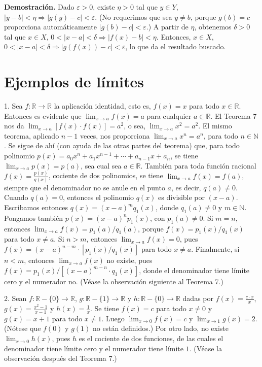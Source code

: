 \documentclass[12pt,oneside]{book}
\begin{document}
\textbf{Demostración.} Dado \(\varepsilon > 0\), existe \(\eta > 0\) tal que \(y \in Y\), \(|y - b| < \eta \Rightarrow |g(y) - c| < \varepsilon\). (No requerimos que sea \(y \neq b\), porque \(g(b) = c\) proporciona automáticamente \(|g(b) - c| < \varepsilon\).) A partir de \(\eta\), obtenemos \(\delta > 0\) tal que \(x \in X\), \(0 < |x - a| < \delta \Rightarrow |f(x) - b| < \eta\). Entonces, \(x \in X\), \(0 < |x - a| < \delta \Rightarrow |g(f(x)) - c| < \varepsilon\), lo que da el resultado buscado.

\section{Ejemplos de límites}

1. Sea \(f: \mathbb{R} \to \mathbb{R}\) la aplicación identidad, esto es, \(f(x) = x\) para todo \(x \in \mathbb{R}\). Entonces es evidente que \(\lim_{x \to a} f(x) = a\) para cualquier \(a \in \mathbb{R}\). El Teorema 7 nos da \(\lim_{x \to a} [f(x) \cdot f(x)] = a^2\), o sea, \(\lim_{x \to a} x^2 = a^2\). El mismo teorema, aplicado \(n-1\) veces, nos proporciona \(\lim_{x \to a} x^n = a^n\), para todo \(n \in \mathbb{N}\). Se sigue de ahí (con ayuda de las otras partes del teorema) que, para todo polinomio
\( p(x) = a_0x^n + a_1x^{n-1} + \cdots + a_{n-1}x + a_n \), se tiene \(\lim_{x \to a} p(x) = p(a)\), sea cual sea \( a \in \mathbb{R} \). También para toda función racional \( f(x) = \frac{p(x)}{q(x)} \), cociente de dos polinomios, se tiene \(\lim_{x \to a} f(x) = f(a)\), siempre que el denominador no se anule en el punto \( a \), es decir, \( q(a) \neq 0 \). Cuando \( q(a) = 0 \), entonces el polinomio \( q(x) \) es divisible por \( (x - a) \). Escribamos entonces \( q(x) = (x - a)^m q_1(x) \), donde \( q_1(a) \neq 0 \) y \( m \in \mathbb{N} \). Pongamos también \( p(x) = (x - a)^n p_1(x) \), con \( p_1(a) \neq 0 \). Si \( m = n \), entonces \(\lim_{x \to a} f(x) = p_1(a)/q_1(a)\), porque \( f(x) = p_1(x)/q_1(x) \) para todo \( x \neq a \). Si \( n > m \), entonces \(\lim_{x \to a} f(x) = 0\), pues \( f(x) = (x - a)^{n-m} \cdot [p_1(x)/q_1(x)] \) para todo \( x \neq a \). Finalmente, si \( n < m \), entonces \(\lim_{x \to a} f(x)\) no existe, pues \( f(x) = p_1(x)/[(x - a)^{m-n} \cdot q_1(x)] \), donde el denominador tiene límite cero y el numerador no. (Véase la observación siguiente al Teorema 7.)

2. Sean \( f: \mathbb{R} - \{0\} \to \mathbb{R} \), \( g: \mathbb{R} - \{1\} \to \mathbb{R} \) y \( h: \mathbb{R} - \{0\} \to \mathbb{R} \) dadas por \( f(x) = \frac{c \cdot x}{x} \), \( g(x) = \frac{x^2 - 1}{x - 1} \) y \( h(x) = \frac{1}{x} \). Se tiene \( f(x) = c \) para todo \( x \neq 0 \) y \( g(x) = x + 1 \) para todo \( x \neq 1 \). Luego \( \lim_{x \to 0} f(x) = c \) y \( \lim_{x \to 1} g(x) = 2 \). (Nótese que \( f(0) \) y \( g(1) \) no están definidos.) Por otro lado, no existe \( \lim_{x \to 0} h(x) \), pues \( h \) es el cociente de dos funciones, de las cuales el denominador tiene límite cero y el numerador tiene límite \( 1 \). (Véase la observación después del Teorema 7.)
\end{document}

